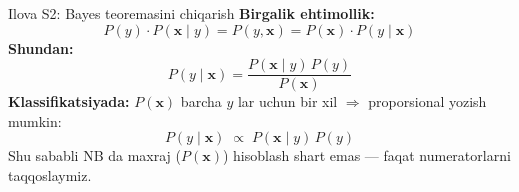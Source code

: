 \documentclass[aspectratio=169,11pt]{beamer}
\begin{document}
\begin{frame}{Ilova S2: Bayes teoremasini chiqarish}
  \small
  \textbf{Birgalik ehtimollik:}
  \[
    P(y)\cdot P(\mathbf{x}\mid y)
    = P(y,\mathbf{x})
    = P(\mathbf{x})\cdot P(y\mid\mathbf{x})
  \]
  \textbf{Shundan:}
  \[
    P(y\mid\mathbf{x})
    =\frac{P(\mathbf{x}\mid y)\,P(y)}{P(\mathbf{x})}
  \]
  \textbf{Klassifikatsiyada:}
  $P(\mathbf{x})$ barcha $y$ lar uchun bir xil
  $\Rightarrow$ proporsional yozish mumkin:
  \[
    P(y\mid\mathbf{x})\;\propto\; P(\mathbf{x}\mid y)\,P(y)
  \]
  Shu sababli NB da maxraj ($P(\mathbf{x})$) hisoblash shart emas ---
  faqat numeratorlarni taqqoslaymiz.
\end{frame}
\end{document}
